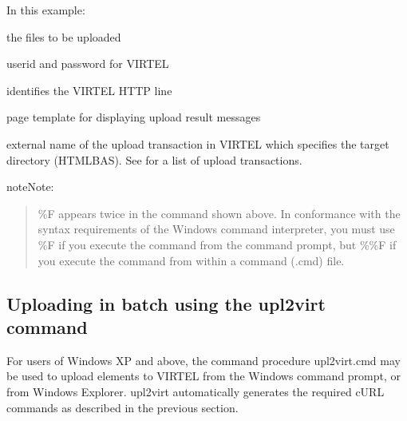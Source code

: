 \documentclass[letterpaper,10pt,english]{sphinxmanual}
\begin{document}
\sphinxAtStartPar
In this example:
\begin{description}
\sphinxAtStartPar
the files to be uploaded

\sphinxAtStartPar
userid and password for VIRTEL

\sphinxAtStartPar
identifies the VIRTEL HTTP line

\sphinxAtStartPar
page template for displaying upload result messages

\sphinxAtStartPar
external name of the upload transaction in VIRTEL which specifies the target directory (HTMLBAS). See {\hyperref[\detokenize{audit_operations_ and_performance:v462ap-http-uploading-pages-signon}]{}} for a list of upload transactions.

\end{description}

\begin{sphinxadmonition}{note}{Note:}\begin{quote}

\sphinxAtStartPar
\%F appears twice in the command shown above. In conformance with the syntax requirements of the Windows command interpreter, you must use \%F if you execute the command from the command prompt, but \%\%F if you execute the command from within a command (.cmd) file.
\end{quote}

\ignorespaces \end{sphinxadmonition}

\ignorespaces 

\subsection{Uploading in batch using the upl2virt command}
\label{\detokenize{audit_operations_ and_performance:uploading-in-batch-using-the-upl2virt-command}}\label{\detokenize{audit_operations_ and_performance:index-66}}
\sphinxAtStartPar
For users of Windows XP and above, the command procedure upl2virt.cmd may be used to upload elements to VIRTEL from the Windows command prompt, or from Windows Explorer. upl2virt automatically generates the required cURL commands as described in the previous section.
\end{document}
